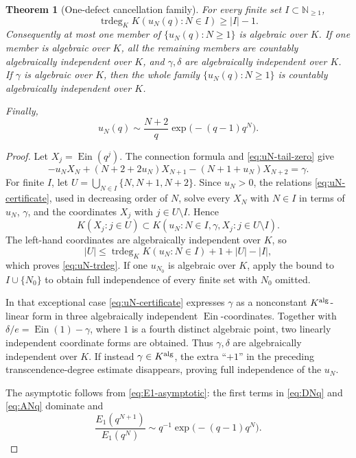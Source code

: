 \documentclass[11pt]{article}
\theoremstyle{keio}
\newtheorem{theorem}{Theorem}[section]
\theoremstyle{definition}
\theoremstyle{remark}
\newcommand{\N}{\mathbb N}
\newcommand{\Ein}{\operatorname{Ein}}
\newcommand{\trdeg}{\operatorname{trdeg}}
\begin{document}
\begin{theorem}[One-defect cancellation family]
\label{thm:uN-defect}
For every finite set \(I\subset\N_{\ge1}\),
\begin{equation}\label{eq:uN-trdeg}
 \boxed{\displaystyle
 \trdeg_K K(u_N(q):N\in I)\ge |I|-1.}
\end{equation}
Consequently at most one member of \(\{u_N(q):N\ge1\}\) is algebraic over
\(K\).  If one member is algebraic over \(K\), all the remaining members are
countably algebraically independent over \(K\), and \(\gamma,\delta\) are
algebraically independent over \(K\).  If \(\gamma\) is algebraic over
\(K\), then the whole family \(\{u_N(q):N\ge1\}\) is countably
algebraically independent over \(K\).

Finally,
\begin{equation}\label{eq:uN-asymptotic}
 u_N(q)\sim\frac{N+2}{q}
 \exp\!\bigl(-(q-1)q^N\bigr).
\end{equation}
\end{theorem}

\begin{proof}
Let \(X_j=\Ein(q^j)\).  The connection formula and
\eqref{eq:uN-tail-zero} give
\begin{equation}\label{eq:uN-certificate}
 -u_NX_N+(N+2+2u_N)X_{N+1}
 -(N+1+u_N)X_{N+2}=\gamma.
\end{equation}
For finite \(I\), let
\(U=\bigcup_{N\in I}\{N,N+1,N+2\}\).  Since \(u_N>0\), the relations
\eqref{eq:uN-certificate}, used in decreasing order of \(N\), solve every
\(X_N\) with \(N\in I\) in terms of \(u_N\), \(\gamma\), and the
coordinates \(X_j\) with \(j\in U\setminus I\).  Hence
\[
 K(X_j:j\in U)
 \subset
 K(u_N:N\in I,\gamma,X_j:j\in U\setminus I).
\]
The left-hand coordinates are algebraically independent over \(K\), so
\[
 |U|\le
 \trdeg_KK(u_N:N\in I)+1+|U|-|I|,
\]
which proves \eqref{eq:uN-trdeg}.  If one \(u_{N_0}\) is algebraic over
\(K\), apply the bound to \(I\cup\{N_0\}\) to obtain full independence of
every finite set with \(N_0\) omitted.

In that exceptional case \eqref{eq:uN-certificate} expresses \(\gamma\) as
a nonconstant \(K^{\rm alg}\)-linear form in three algebraically independent
\(\Ein\)-coordinates.  Together with
\(\delta/e=\Ein(1)-\gamma\), where \(1\) is a fourth distinct algebraic
point, two linearly independent coordinate forms are obtained.  Thus
\(\gamma,\delta\) are algebraically independent over \(K\).  If instead
\(\gamma\in K^{\rm alg}\), the extra ``\(+1\)'' in the preceding
transcendence-degree estimate disappears, proving full independence of the
\(u_N\).

The asymptotic follows from \eqref{eq:E1-asymptotic}: the first terms in
\eqref{eq:DNq} and \eqref{eq:ANq} dominate and
\[
 \frac{E_1(q^{N+1})}{E_1(q^N)}
 \sim q^{-1}\exp\!\bigl(-(q-1)q^N\bigr).
\]
\end{proof}
\end{document}
